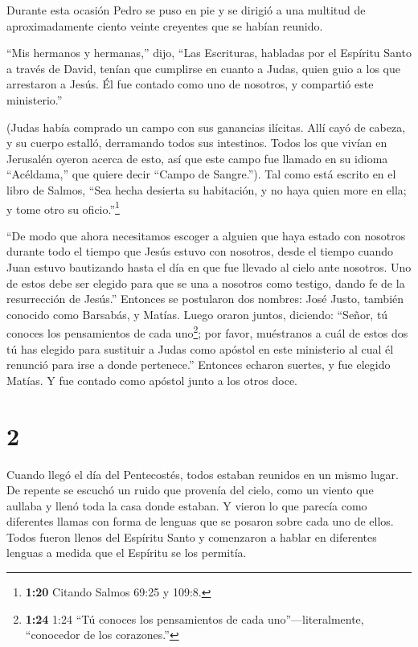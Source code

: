  Durante esta ocasión Pedro se puso en pie y se dirigió a
una multitud de aproximadamente ciento veinte creyentes que se habían
reunido.

 ``Mis hermanos y hermanas,'' dijo, ``Las Escrituras,
habladas por el Espíritu Santo a través de David, tenían que cumplirse
en cuanto a Judas, quien guio a los que arrestaron a Jesús.
 Él fue contado como uno de nosotros, y compartió este
ministerio.''

 (Judas había comprado un campo con sus ganancias ilícitas.
Allí cayó de cabeza, y su cuerpo estalló, derramando todos sus
intestinos.  Todos los que vivían en Jerusalén oyeron
acerca de esto, así que este campo fue llamado en su idioma
``Acéldama,'' que quiere decir ``Campo de Sangre.'').  Tal
como está escrito en el libro de Salmos, ``Sea hecha desierta su
habitación, y no haya quien more en ella; y tome otro su
oficio.''\footnote{\textbf{1:20} Citando Salmos 69:25 y 109:8.}

 ``De modo que ahora necesitamos escoger a alguien que haya
estado con nosotros durante todo el tiempo que Jesús estuvo con
nosotros,  desde el tiempo cuando Juan estuvo bautizando
hasta el día en que fue llevado al cielo ante nosotros. Uno de estos
debe ser elegido para que se una a nosotros como testigo, dando fe de la
resurrección de Jesús.''  Entonces se postularon dos
nombres: José Justo, también conocido como Barsabás, y Matías.
 Luego oraron juntos, diciendo: ``Señor, tú conoces los
pensamientos de cada uno\footnote{\textbf{1:24} 1:24 ``Tú conoces los
  pensamientos de cada uno''---literalmente, ``conocedor de los
  corazones.''}; por favor, muéstranos a cuál de estos dos tú has
elegido  para sustituir a Judas como apóstol en este
ministerio al cual él renunció para irse a donde pertenece.''
 Entonces echaron suertes, y fue elegido Matías. Y fue
contado como apóstol junto a los otros doce.

\hypertarget{section-1}{%
\section{2}\label{section-1}}

 Cuando llegó el día del Pentecostés, todos estaban reunidos
en un mismo lugar.  De repente se escuchó un ruido que
provenía del cielo, como un viento que aullaba y llenó toda la casa
donde estaban.  Y vieron lo que parecía como diferentes
llamas con forma de lenguas que se posaron sobre cada uno de ellos.
 Todos fueron llenos del Espíritu Santo y comenzaron a
hablar en diferentes lenguas a medida que el Espíritu se los permitía.

